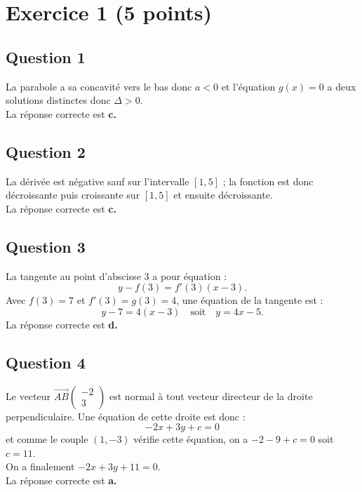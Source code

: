 \section*{Exercice 1 (5 points)}
	
	\subsection*{Question 1}
La parabole a sa concavité vers le bas donc \(a < 0\) et l’équation \(g(x) = 0\) a deux solutions distinctes donc \(\Delta > 0\). \\
La réponse correcte est \textbf{c.}
	
	\subsection*{Question 2}
	
La dérivée est négative sauf sur l’intervalle \([1, 5]\) ; la fonction est donc décroissante puis croissante sur \([1, 5]\) et ensuite décroissante.\\
 La réponse correcte est \textbf{c.}
	
	\subsection*{Question 3}
	
La tangente au point d’abscisse 3 a pour équation :
\[ y - f(3) = f'(3)(x - 3). \]
Avec \(f(3) = 7\) et \(f'(3) = g(3) = 4\), une équation de la tangente est :
\[ y - 7 = 4(x - 3) \quad \text{soit} \quad y = 4x - 5. \]
La réponse correcte est \textbf{d.}
	
	\subsection*{Question 4}
	
Le vecteur \(\overrightarrow{AB} \left( \begin{array}{c} -2 \\ 3 \end{array} \right)\) est normal à tout vecteur directeur de la droite perpendiculaire. Une équation de cette droite est donc :
\[-2x + 3y + c = 0 \]
et comme le couple \((1, -3)\) vérifie cette équation, on a \(-2 - 9 + c = 0\) soit \(c = 11\).\\
 On a finalement \(-2x + 3y + 11 = 0\).\\
  La réponse correcte est \textbf{a.}
	
